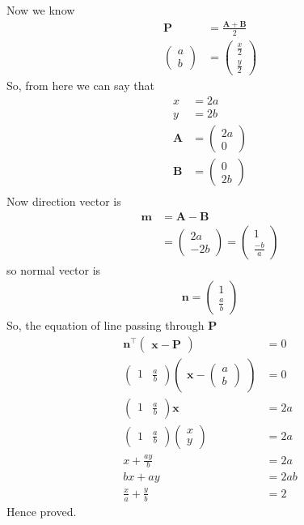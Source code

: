 \documentclass[12pt]{article}
\newcommand{\myvec}[1]{\ensuremath{\begin{pmatrix}#1\end{pmatrix}}}
\let\vec\mathbf
\begin{document}
Now we know
\begin{align}
	\vec{P}&=\frac{\vec{A}+\vec{B}}{2}\\
	\myvec{a\\b}&=\myvec{\frac{x}{2}\\\frac{y}{2}}
\end{align}
So, from here we can say that
\begin{align}
	x&=2a\\
	y&=2b\\
	\vec{A} &= \myvec{2a\\0}\\
	\vec{B} &= \myvec{0\\2b}\\
\end{align}
Now direction vector is
\begin{align}
	\vec{m} &= \vec{A}-\vec{B}\\
		&= \myvec{2a\\-2b} = \myvec{1\\\frac{-b}{a}}
\end{align}
so normal vector is
\begin{align}
	\vec{n} = \myvec{1\\\frac{a}{b}}
\end{align}
So, the equation of line passing through $\vec{P}$
\begin{align}
	\vec{n}^{\top} \myvec{\vec{x}-\vec{P}} &= 0\\
	\myvec{1 & \frac{a}{b}}\myvec{\vec{x}-\myvec{a\\b}}&=0\\
	\myvec{1 & \frac{a}{b}}\vec{x}&=2a\\
	\myvec{1 & \frac{a}{b}}\myvec{x\\y}&=2a\\
	x+\frac{ay}{b}&=2a\\
	bx+ay&=2ab\\
	\frac{x}{a}+\frac{y}{b}&=2
\end{align}
Hence proved.
\end{document}
